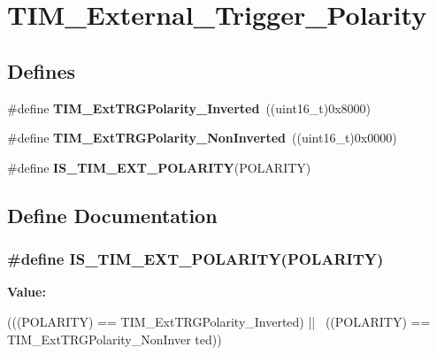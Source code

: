 \hypertarget{group__TIM__External__Trigger__Polarity}{
\section{TIM\_\-External\_\-Trigger\_\-Polarity}
\label{group__TIM__External__Trigger__Polarity}
}
\subsection*{Defines}
\begin{DoxyCompactItemize}
\item 
\hypertarget{group__TIM__External__Trigger__Polarity_ga96f3959a02c0491ab8d65cfa384ce7e3}{
\#define {\bfseries TIM\_\-ExtTRGPolarity\_\-Inverted}~((uint16\_\-t)0x8000)}
\label{group__TIM__External__Trigger__Polarity_ga96f3959a02c0491ab8d65cfa384ce7e3}

\item 
\hypertarget{group__TIM__External__Trigger__Polarity_ga63fe7c58c491d2a812d5621b71c2d0c5}{
\#define {\bfseries TIM\_\-ExtTRGPolarity\_\-NonInverted}~((uint16\_\-t)0x0000)}
\label{group__TIM__External__Trigger__Polarity_ga63fe7c58c491d2a812d5621b71c2d0c5}

\item 
\#define {\bfseries IS\_\-TIM\_\-EXT\_\-POLARITY}(POLARITY)
\end{DoxyCompactItemize}


\subsection{Define Documentation}
\hypertarget{group__TIM__External__Trigger__Polarity_ga489ea1fed28375dec49cf1b8dfac47ca}{
\subsubsection[{IS\_\-TIM\_\-EXT\_\-POLARITY}]{\setlength{\rightskip}{0pt plus 5cm}\#define IS\_\-TIM\_\-EXT\_\-POLARITY(POLARITY)}}
\label{group__TIM__External__Trigger__Polarity_ga489ea1fed28375dec49cf1b8dfac47ca}
{\bfseries Value:}
\begin{DoxyCode}
(((POLARITY) == TIM_ExtTRGPolarity_Inverted) || \
                                       ((POLARITY) == TIM_ExtTRGPolarity_NonInver
      ted))
\end{DoxyCode}
